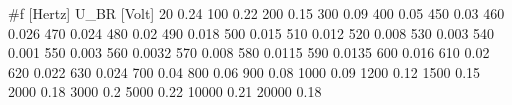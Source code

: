 #f [Hertz] U_BR [Volt]
20      0.24
100     0.22             
200     0.15                 
300     0.09             
400     0.05            
450     0.03            
460     0.026            
470     0.024           
480     0.02          
490     0.018           
500     0.015           
510     0.012          
520     0.008         
530     0.003         
540     0.001          
550     0.003         
560     0.0032          
570     0.008          
580     0.0115           
590     0.0135           
600     0.016           
610     0.02         
620     0.022           
630     0.024         
700     0.04         
800     0.06          
900     0.08           
1000    0.09              
1200    0.12             
1500    0.15             
2000    0.18             
3000    0.2              
5000    0.22             
10000   0.21              
20000   0.18             
